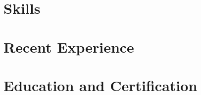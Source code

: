 \documentclass[a4paper,12pt]{article}
\begin{document}


\section{Skills}


\section{Recent Experience}


\section{Education and Certification}


\end{document}

